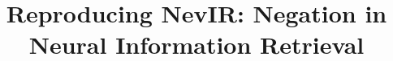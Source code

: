 \documentclass[sigconf,natbib=true,review=false,anonymous=false, nonacm]{acmart}
\begin{document}
\title{Reproducing NevIR: Negation in Neural Information Retrieval}





\maketitle










\end{document}
